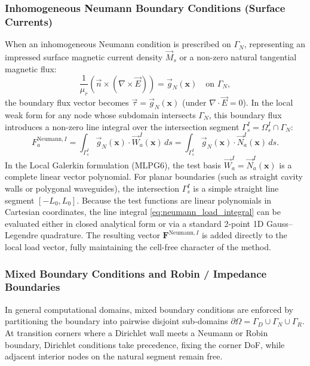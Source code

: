 \documentclass[VANCOUVER,Times1COL]{WileyNJD-v5}
\begin{document}
\subsubsection{Inhomogeneous Neumann Boundary Conditions (Surface Currents)}
\label{subsubsec:neumann_inhomogeneous}

When an inhomogeneous Neumann condition is prescribed on $\Gamma_N$, representing an impressed surface magnetic current density $\vec{M}_s$ or a non-zero natural tangential magnetic flux:
\begin{equation}
    \frac{1}{\mu_r} \left( \vec{n} \times (\nabla \times \vec{E}) \right) = \vec{g}_N(\mathbf{x}) \quad \text{on } \Gamma_N,
    \label{eq:neumann_inhomogeneous_pde}
\end{equation}
the boundary flux vector becomes $\vec{\tau} = \vec{g}_N(\mathbf{x})$ (under $\nabla \cdot \vec{E} = 0$). In the local weak form for any node whose subdomain intersects $\Gamma_N$, this boundary flux introduces a non-zero line integral over the intersection segment $\Gamma_s^I = \Omega_s^I \cap \Gamma_N$:
\begin{equation}
    F_a^{\mathrm{Neumann}, I} = \int_{\Gamma_s^I} \vec{g}_N(\mathbf{x}) \cdot \vec{W}_a^I(\mathbf{x}) \, ds = \int_{\Gamma_s^I} \vec{g}_N(\mathbf{x}) \cdot \vec{N}_a^I(\mathbf{x}) \, ds.
    \label{eq:neumann_load_integral}
\end{equation}
In the Local Galerkin formulation (MLPG6), the test basis $\vec{W}_a^I = \vec{N}_a^I(\mathbf{x})$ is a complete linear vector polynomial. For planar boundaries (such as straight cavity walls or polygonal waveguides), the intersection $\Gamma_s^I$ is a simple straight line segment $[-L_0, L_0]$. Because the test functions are linear polynomials in Cartesian coordinates, the line integral \eqref{eq:neumann_load_integral} can be evaluated either in closed analytical form or via a standard 2-point 1D Gauss--Legendre quadrature. The resulting vector $\mathbf{F}^{\mathrm{Neumann}, I}$ is added directly to the local load vector, fully maintaining the cell-free character of the method.

\subsubsection{Mixed Boundary Conditions and Robin / Impedance Boundaries}
\label{subsubsec:mixed_robin_bc}

In general computational domains, mixed boundary conditions are enforced by partitioning the boundary into pairwise disjoint sub-domains $\partial\Omega = \Gamma_D \cup \Gamma_N \cup \Gamma_R$. At transition corners where a Dirichlet wall meets a Neumann or Robin boundary, Dirichlet conditions take precedence, fixing the corner DoF, while adjacent interior nodes on the natural segment remain free.
\end{document}
